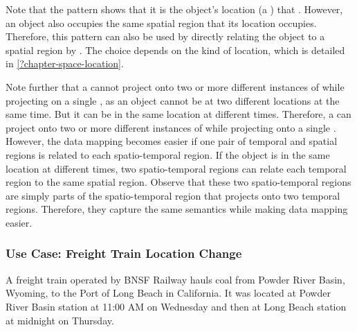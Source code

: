 Note that the pattern shows that it is the object's location (a ) that . However, an object also occupies the same spatial region that its location occupies. Therefore, this pattern can also be used by directly relating the object to a spatial region by . The choice depends on the kind of location, which is detailed in \cref{?chapter-space-location}.   

Note further that a  cannot project onto two or more different instances of  while projecting on a single , as an object cannot be at two different locations at the same time. But it can be in the same location at different times. Therefore, a  can project onto two or more different instances of  while projecting onto a single . However, the data mapping becomes easier if one pair of temporal and spatial regions is related to each spatio-temporal region. If the object is in the same location at different times, two spatio-temporal regions can relate each temporal region to the same spatial region. Observe that these two spatio-temporal regions are simply parts of the spatio-temporal region that projects onto two temporal regions. Therefore, they capture the same semantics while making data mapping easier.     

\subsubsection*{Use Case: Freight Train Location Change} 
A freight train operated by BNSF Railway hauls coal from Powder River Basin, Wyoming, to the Port of Long Beach in California. It was located at Powder River Basin station at 11:00 AM on Wednesday and then at Long Beach station at midnight on Thursday.

